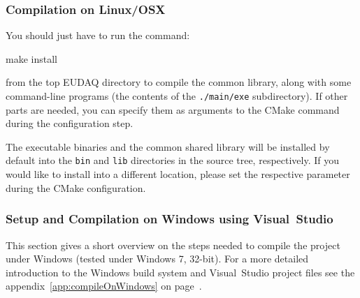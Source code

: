 \subsubsection{Compilation on Linux/OSX}
You should just have to run the command:
\begin{listing}[mybash]
make install
\end{listing}

from the top EUDAQ directory to compile the common library,
along with some command-line programs (the contents of the \texttt{./main/exe} subdirectory).
If other parts are needed, you can specify them as arguments to the
CMake command during the configuration step.

The executable binaries and the common shared library will be installed by default into the
\texttt{bin} and \texttt{lib} directories in the source tree,
respectively. If you would like to install into a different location,
please set the respective parameter during the CMake configuration.

\subsubsection{Setup and Compilation on Windows using Visual~Studio}

This section gives a short overview on the steps needed to compile the
project under Windows (tested under Windows 7, 32-bit). For a more
detailed introduction to the Windows build system and Visual~Studio
project files see the appendix~\ref{app:compileOnWindows} on
page~\pageref{app:compileOnWindows}.

